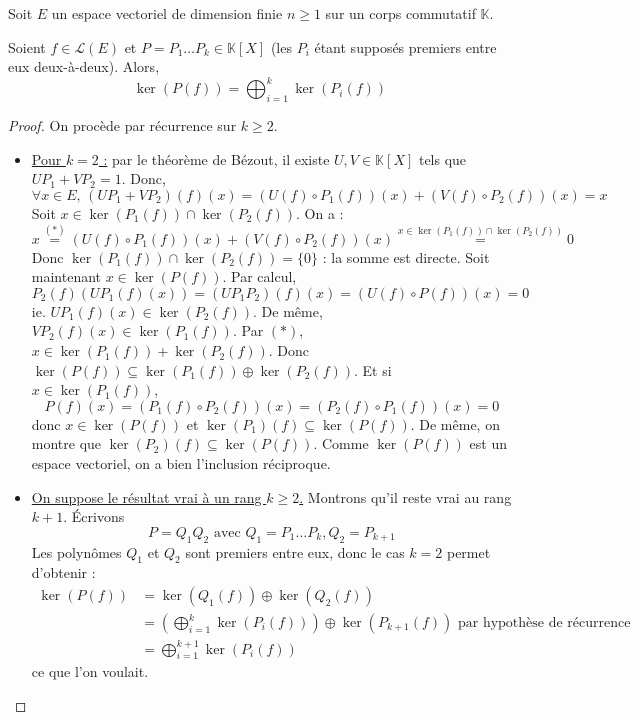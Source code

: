 






	Soit $E$ un espace vectoriel de dimension finie $n \geq 1$ sur un corps commutatif $\mathbb{K}$.

	\begin{theorem}
		\label{lemme-des-noyaux-1}
		Soient $f \in \mathcal{L}(E)$ et $P = P_1 \dots P_k \in \mathbb{K}[X]$ (les $P_i$ étant supposés premiers entre eux deux-à-deux). Alors,
		\[ \ker(P(f)) = \bigoplus_{i = 1}^k \ker(P_i(f)) \]
	\end{theorem}

	\begin{proof}
		On procède par récurrence sur $k \geq 2$.
		\begin{itemize}
			\item \uline{Pour $k = 2$ :} par le théorème de Bézout, il existe $U, V \in \mathbb{K}[X]$ tels que $UP_1 + VP_2 = 1$. Donc,
			\[ \forall x \in E, \, (UP_1 + VP_2)(f)(x) = (U(f) \circ P_1(f))(x) + (V(f) \circ P_2(f))(x) = x \tag{$*$} \]
			Soit $x \in \ker(P_1(f)) \cap \ker(P_2(f))$. On a :
			\[ x \overset{(*)}{=} (U(f) \circ P_1(f))(x) + (V(f) \circ P_2(f))(x) \overset{x \in \ker(P_1(f)) \cap \ker(P_2(f))}{=} 0 \]
			Donc $\ker(P_1(f)) \cap \ker(P_2(f)) = \{ 0 \}$ : la somme est directe.
			\newpar
			Soit maintenant $x \in \ker(P(f))$. Par calcul,
			\[ P_2(f)(UP_1(f)(x)) = (UP_1P_2)(f)(x) = (U(f) \circ P(f))(x) = 0 \]
			ie. $UP_1(f)(x) \in \ker(P_2(f))$. De même, $VP_2(f)(x) \in \ker(P_1(f))$. Par $(*)$, $x \in \ker(P_1(f)) + \ker(P_2(f))$. Donc $\ker(P(f)) \subseteq \ker(P_1(f)) \oplus \ker(P_2(f))$.
			\newpar
			Et si $x \in \ker(P_1(f))$,
			\[ P(f)(x) = (P_1(f) \circ P_2(f))(x) = (P_2(f) \circ P_1(f))(x) = 0 \]
			donc $x \in \ker(P(f))$ et $\ker(P_1)(f) \subseteq \ker(P(f))$. De même, on montre que $\ker(P_2)(f) \subseteq \ker(P(f))$. Comme $\ker(P(f))$ est un espace vectoriel, on a bien l'inclusion réciproque.
			\item \uline{On suppose le résultat vrai à un rang $k \geq 2$.} Montrons qu'il reste vrai au rang $k+1$. Écrivons
			\[ P = Q_1Q_2 \text{ avec } Q_1 = P_1 \dots P_k, Q_2 = P_{k+1} \]
			Les polynômes $Q_1$ et $Q_2$ sont premiers entre eux, donc le cas $k = 2$ permet d'obtenir :
			\begin{align*}
				\ker(P(f)) &= \ker(Q_1(f)) \oplus \ker(Q_2(f)) \\
				&= \left( \bigoplus_{i = 1}^k \ker(P_i(f)) \right) \oplus \ker(P_{k+1}(f)) \text{ par hypothèse de récurrence} \\
				&= \bigoplus_{i = 1}^{k+1} \ker(P_i(f))
			\end{align*}
			ce que l'on voulait.
		\end{itemize}
	\end{proof}

